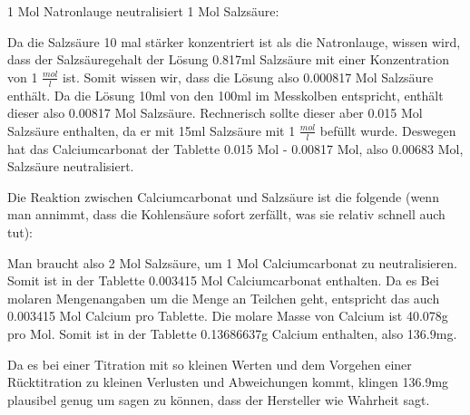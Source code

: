 \documentclass[8pt, letterpaper]{article}
\newcommand{\mpl}[1]{#1 \(\frac{mol}{l}\)}
\begin{document}
1 Mol Natronlauge neutralisiert 1 Mol Salzsäure:
\begin{center}
\end{center}

Da die Salzsäure 10 mal stärker konzentriert ist als die Natronlauge, wissen wird, dass der Salzsäuregehalt der Lösung 0.817ml Salzsäure mit einer Konzentration von \mpl{1} ist.
Somit wissen wir, dass die Lösung also 0.000817 Mol Salzsäure enthält. Da die Lösung 10ml von den 100ml im Messkolben entspricht, enthält dieser also 0.00817 Mol Salzsäure.
Rechnerisch sollte dieser aber 0.015 Mol Salzsäure enthalten, da er mit 15ml Salzsäure mit \mpl{1} befüllt wurde. Deswegen hat das Calciumcarbonat der Tablette 0.015 Mol - 0.00817 Mol, also 0.00683 Mol, Salzsäure neutralisiert.

Die Reaktion zwischen Calciumcarbonat und Salzsäure ist die folgende (wenn man annimmt, dass die Kohlensäure sofort zerfällt, was sie relativ schnell auch tut):
\begin{center}
\end{center}

Man braucht also 2 Mol Salzsäure, um 1 Mol Calciumcarbonat zu neutralisieren. Somit ist in der Tablette 0.003415 Mol Calciumcarbonat enthalten.
Da es Bei molaren Mengenangaben um die Menge an Teilchen geht, entspricht das auch 0.003415 Mol Calcium pro Tablette.
Die molare Masse von Calcium ist 40.078g pro Mol.
Somit ist in der Tablette 0.13686637g Calcium enthalten, also 136.9mg.

Da es bei einer Titration mit so kleinen Werten und dem Vorgehen einer Rücktitration zu kleinen Verlusten und Abweichungen kommt, klingen 136.9mg plausibel genug um sagen zu können, dass der Hersteller wie Wahrheit sagt.
\end{document}
